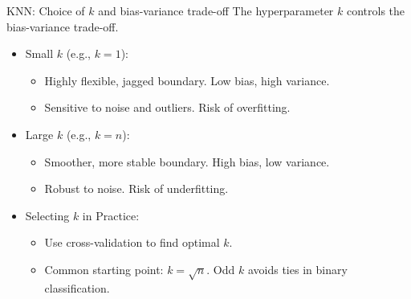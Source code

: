 \documentclass[aspectratio=169]{beamer}
\newcommand{\1}{\mathbf{1}}
\begin{document}
\begin{frame}{KNN: Choice of $k$ and bias-variance trade-off}
    \small
    The hyperparameter $k$ controls the bias-variance trade-off.
    
    \begin{itemize}
        \item Small $k$ (e.g., $k=1$):
        \begin{itemize}
            \item Highly flexible, jagged boundary. Low bias, high variance.
            \item Sensitive to noise and outliers. Risk of overfitting.
        \end{itemize}
        \item Large $k$ (e.g., $k=n$):
        \begin{itemize}
            \item Smoother, more stable boundary. High bias, low variance.
            \item Robust to noise. Risk of underfitting.
        \end{itemize}
        \item Selecting $k$ in Practice:
        \begin{itemize}
            \item Use cross-validation to find optimal $k$.
            \item Common starting point: $k = \sqrt{n}$. Odd $k$ avoids ties in binary classification.
        \end{itemize}
    \end{itemize}
\end{frame}
\end{document}
